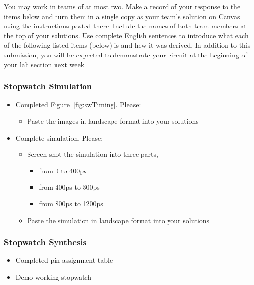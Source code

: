 You may work in teams of at most two. Make a record of your response to
the items below and turn them in a single copy as your team's solution
on Canvas using the instructions posted there. Include the names of both
team members at the top of your solutions. Use complete English
sentences to introduce what each of the following listed items (below)
is and how it was derived. In addition to this submission, you will be
expected to demonstrate your circuit at the beginning of your lab
section next week.

\subsubsection{Stopwatch Simulation}

\begin{itemize}
\item
  Completed Figure~\ref{fig:swTiming}. Please:

  \begin{itemize}
  \item
    Paste the images in landscape format into your solutions
  \end{itemize}
\item
  Complete simulation. Please:

  \begin{itemize}
  \item
    Screen shot the simulation into three parts,

    \begin{itemize}
    \item
      from 0 to 400ps
    \item
      from 400ps to 800ps
    \item
      from 800ps to 1200ps
    \end{itemize}
  \item
    Paste the simulation in landscape format into your solutions
  \end{itemize}
\end{itemize}

\subsubsection{Stopwatch Synthesis}

\begin{itemize}
\item
  Completed pin assignment table
\item
  Demo working stopwatch
\end{itemize}


